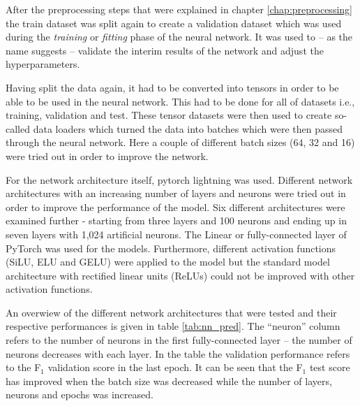 After the preprocessing steps that were explained in chapter \ref{chap:preprocessing} the train dataset was split again to create a validation dataset which was used during the \textit{training} or \textit{fitting} phase of the neural network. It was used to -- as the name suggests -- validate the interim results of the network and adjust the hyperparameters. \citep[][p. 184]{TanPang-Ning2006}

Having split the data again, it had to be converted into tensors in order to be able to be used in the neural network. This had to be done for all of datasets i.e., training, validation and test. These tensor datasets were then used to create so-called data loaders which turned the data into batches which were then passed through the neural network. Here a couple of different batch sizes (64, 32 and 16) were tried out in order to improve the network.

For the network architecture itself, pytorch lightning was used. Different network architectures with an increasing number of layers and neurons were tried out in order to improve the performance of the model. Six different architectures were examined further - starting from three layers and 100 neurons and ending up in seven layers with 1,024 artificial neurons. The Linear or fully-connected layer of PyTorch was used for the models. \citep{PyTorch2019, PyTorch2021} Furthermore, different activation functions (SiLU, ELU and GELU) were applied to the model but the standard model architecture with rectified linear units (ReLUs) could not be improved with other activation functions.

An overwiew of the different network architectures that were tested and their respective performances is given in table \ref{tab:nn_pred}. The \enquote{neuron} column refers to the number of neurons in the first fully-connected layer -- the number of neurons decreases with each layer. In the table the validation performance refers to the F$_1$ validation score in the last epoch. It can be seen that the F$_1$ test score has improved when the batch size was decreased while the number of layers, neurons and epochs was increased.